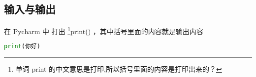 


\subsection{输入与输出}

在 Pycharm 中 打出 \footnote{单词 print 的中文意思是打印,所以括号里面的内容是打印出来的？}print() ，其中括号里面的内容就是输出内容 

\begin{lstlisting}[language=python]
print(你好)
\end{lstlisting}
